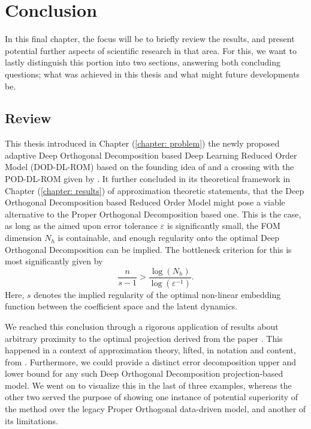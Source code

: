 \chapter{Conclusion} \label{chapter: conclusion}

In this final chapter, the focus will be to briefly review the results, and present potential further aspects 
of scientific research in that area. For this, we want to lastly distinguish
this portion into two sections, answering both concluding questions; what was achieved in this thesis
and what might future developments be.

\section{Review}


This thesis introduced in Chapter (\ref{chapter: problem}) the newly proposed adaptive Deep
Orthogonal Decomposition based Deep Learning Reduced Order Model (DOD-DL-ROM)
based on the founding idea of \cite{franco2024} and a crossing with the POD-DL-ROM
given by \cite{fresca2022}. It further
concluded in its theoretical framework in Chapter (\ref{chapter: results}) 
of approximation theoretic statements, that
the Deep Orthogonal Decomposition based Reduced Order Model might pose a viable alternative to the 
Proper Orthogonal Decomposition based one. This is the case, as 
long as the aimed upon error tolerance $\varepsilon$ is significantly small, the FOM dimension $N_h$ is containable,
and enough regularity onto the optimal Deep Orthogonal Decomposition can be implied. The bottleneck
criterion for this is most significantly given by 
\begin{equation*}
    \frac{n}{s-1} > \frac{\log(N_h)}{\log(\varepsilon^{-1})}.
\end{equation*}
Here, $s$ denotes the implied regularity of the optimal non-linear embedding function between the coefficient
space and the latent dynamics.

We reached this conclusion through a rigorous application of results about arbitrary proximity to the
optimal projection
derived from the paper \cite{franco2024}. This happened in a context of approximation theory, lifted, in notation and
content, from \cite{gühring2019nn}. Furthermore, we could provide a distinct error decomposition upper and
lower bound for any such Deep Orthogonal Decomposition projection-based model. We went on to visualize this
in the last of three examples, whereas the other two served the purpose of showing one instance of potential
superiority of the method over the legacy Proper Orthogonal data-driven model, and another of its limitations.

